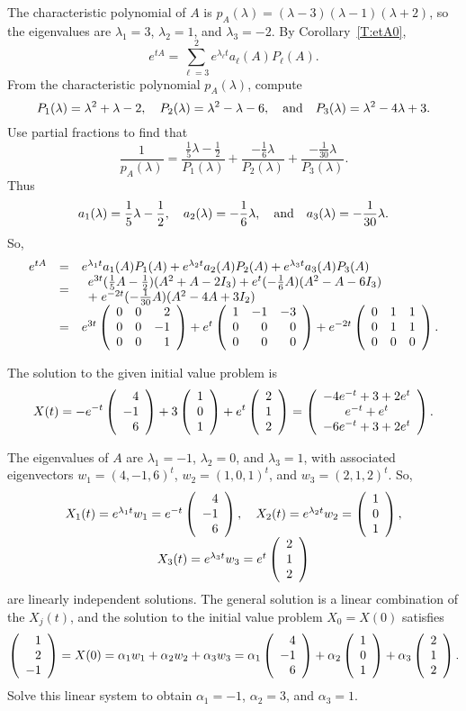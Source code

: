\documentclass{ximera}
\begin{document}
\soln The characteristic polynomial of $A$ is
$p_A(\lambda) = (\lambda - 3)(\lambda - 1)(\lambda + 2)$, so the
eigenvalues are $\lambda_1 = 3$, $\lambda_2 = 1$, and $\lambda_3 = -2$.
By Corollary~\ref{T:etA0},
\[
e^{tA} = \sum_{\ell = 3}^2 e^{\lambda_\ell t}a_\ell(A)P_\ell(A).
\]
From the characteristic polynomial $p_A(\lambda)$, compute
\[
P_1(\lambda) = \lambda^2 + \lambda - 2, \quad
P_2(\lambda) = \lambda^2 - \lambda - 6, \quad\mbox{and}\quad
P_3(\lambda) = \lambda^2 - 4\lambda + 3.
\]
Use partial fractions to find that
\[
\frac{1}{p_A(\lambda)} =
\frac{\frac{1}{5}\lambda - \frac{1}{2}}{P_1(\lambda)}
+ \frac{-\frac{1}{6}\lambda}{P_2(\lambda)}
+ \frac{-\frac{1}{30}\lambda}{P_3(\lambda)}.
\]
Thus
\[
a_1(\lambda) = \frac{1}{5}\lambda - \frac{1}{2}, \quad
a_2(\lambda) = -\frac{1}{6}\lambda, \quad\mbox{and}\quad
a_3(\lambda) = -\frac{1}{30}\lambda.
\]
So,
\[
\begin{array}{rcl}
e^{tA} & = & e^{\lambda_1 t}a_1(A)P_1(A) + e^{\lambda_2 t}a_2(A)P_2(A)
+ e^{\lambda_3 t}a_3(A)P_3(A) \\
& = &
\begin{array}{l} e^{3t}(\frac{1}{5}A - \frac{1}{2})(A^2 + A - 2I_3)
+ e^t(-\frac{1}{6}A)(A^2 - A - 6I_3) \\
+\; e^{-2t}(-\frac{1}{30}A)(A^2 - 4A + 3I_2) \end{array} \\
& = & e^{3t}\left(\begin{array}{rrr} 0 & 0 & 2 \\ 0 & 0 & -1 \\ 0 & 0 & 1\end{array}\right)
+ e^t\left(\begin{array}{rrr} 1 & -1 & -3 \\ 0 & 0 & 0 \\ 0 & 0 & 0\end{array}\right)
+ e^{-2t}\left(\begin{array}{rrr} 0 & 1 & 1 \\ 0 & 1 & 1 \\ 0 & 0 & 0\end{array}\right).
\end{array}
\]

 \ans The solution to the given initial value problem is
\[
X(t) = -e^{-t}\left(\begin{array}{r} 4 \\ -1 \\ 6\end{array}\right) +
3\left(\begin{array}{r} 1 \\ 0 \\ 1\end{array}\right) + e^t\left(\begin{array}{r} 2 \\ 1 \\ 2\end{array}\right)
= \left(\begin{array}{c} -4e^{-t} + 3 + 2e^t \\ e^{-t} + e^t \\ -6e^{-t} + 3 + 2e^t\end{array}\right).
\]

\soln The eigenvalues of $A$ are $\lambda_1 = -1$, $\lambda_2 = 0$, and
$\lambda_3 = 1$, with associated eigenvectors $w_1 = (4,-1,6)^t$,
$w_2 = (1,0,1)^t$, and $w_3 = (2,1,2)^t$.  So,
\[
\begin{array}{c}
X_1(t) = e^{\lambda_1 t}w_1 = e^{-t}\left(\begin{array}{r} 4 \\ -1 \\ 6\end{array}\right), \quad
X_2(t) = e^{\lambda_2 t}w_2 = \left(\begin{array}{r} 1 \\ 0 \\ 1\end{array}\right), \\
X_3(t) = e^{\lambda_3 t}w_3 = e^t\left(\begin{array}{r} 2 \\ 1 \\ 2\end{array}\right)
\end{array}
\]
are linearly independent solutions.  The general solution is a linear
combination of the $X_j(t)$, and the solution to the initial value
problem $X_0 = X(0)$ satisfies
\[
\left(\begin{array}{r} 1 \\ 2 \\ -1\end{array}\right) = X(0) = \alpha_1w_1 + \alpha_2w_2 + \alpha_3w_3
= \alpha_1\left(\begin{array}{r} 4 \\ -1 \\ 6\end{array}\right) + \alpha_2\left(\begin{array}{r} 1 \\ 0 \\ 1\end{array}\right)
+ \alpha_3\left(\begin{array}{r} 2 \\ 1 \\ 2\end{array}\right).
\]
Solve this linear system to obtain $\alpha_1 = -1$,
$\alpha_2 = 3$, and $\alpha_3 = 1$.
\end{document}

